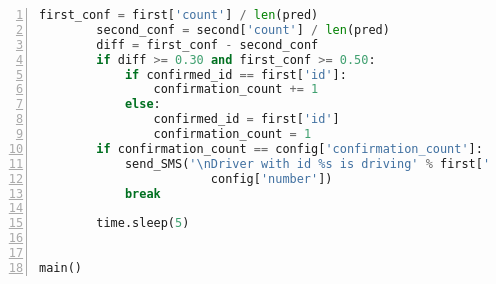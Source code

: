 \begin{lstlisting}[frame=lines, caption=Ausschnitt Fahreridentifikation, captionpos=b, label = lst:a_sw_rf, numbers=left, language=Python, showstringspaces=false, basicstyle=\footnotesize]
        first_conf = first['count'] / len(pred)
        second_conf = second['count'] / len(pred)
        diff = first_conf - second_conf
        if diff >= 0.30 and first_conf >= 0.50:
            if confirmed_id == first['id']:
                confirmation_count += 1
            else:
                confirmed_id = first['id']
                confirmation_count = 1
        if confirmation_count == config['confirmation_count']:
            send_SMS('\nDriver with id %s is driving' % first['id'],
                        config['number'])
            break

        time.sleep(5)


main()

\end{lstlisting}
\clearpage